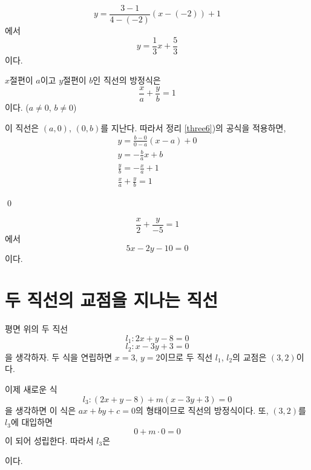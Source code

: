 \documentclass{oblivoir}
\begin{document}
\label{three7}
\begin{mdframed}
\[y=\frac{3-1}{4-(-2)}\left(x-(-2)\right)+1\]
에서
\[y=\frac13x+\frac53\]
이다.
\end{mdframed}

\label{three8}

\clearpage
\begin{mdframed}
\theo{}\label{three9}
\(x\)절편이 \(a\)이고 \(y\)절편이 \(b\)인 직선의 방정식은 
\[\frac xa+\frac yb=1\]
이다.
(\(a\neq0\), \(b\neq0\))
\end{mdframed}

\proo
이 직선은 \((a,0)\), \((0,b)\)를 지난다.
따라서 정리 \ref{three6})의 공식을 적용하면,
\begin{gather*}
y=\frac{b-0}{0-a}(x-a)+0\\
y=-\frac bax+b\\
\frac yb=-\frac xa+1\\
\frac xa+\frac yb=1
\end{gather*}
\par\vspace{-20pt}\qed\par

\label{three10}
\begin{mdframed}
\[\frac x2+\frac y{-5}=1\]
에서
\[5x-2y-10=0\]
이다.
\end{mdframed}

\label{three11}

\section{두 직선의 교점을 지나는 직선}

\exam{}\label{inter1}
평면 위의 두 직선
\[l_1:2x+y-8=0\]
\[l_2:x-3y+3=0\]
을 생각하자.
두 식을 연립하면 \(x=3\), \(y=2\)이므로
두 직선 $l_1$, $l_2$의 교점은 \((3,2)\)이다.

\medskip
이제 새로운 식
\[l_3:(2x+y-8)+m(x-3y+3)=0\]
을 생각하면 이 식은 \(ax+by+c=0\)의 형태이므로 직선의 방정식이다.
또, \((3,2)\)를 $l_3$에 대입하면
\[0+m\cdot0=0\]
이 되어 성립한다.
따라서 $l_3$은
\begin{center}
\end{center}
이다.
\end{document}
